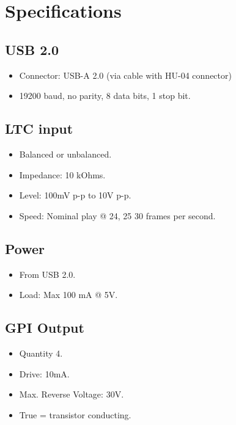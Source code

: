\documentclass{article}
\begin{document}
	\section{Specifications}\label{specifications}
		
		\subsection{USB 2.0}\label{usb-2.0}
			\begin{itemize}
				\item
				Connector: USB-A 2.0 (via cable with HU-04 connector)
				\item
				19200 baud, no parity, 8 data bits, 1 stop bit.
			\end{itemize}
		
		\subsection{LTC input}\label{ltc-input-1}
			\begin{itemize}
				\item
				Balanced or unbalanced.
				\item
				Impedance: 10 kOhms.
				\item
				Level: 100mV p-p to 10V p-p.
				\item
				Speed: Nominal play @ 24, 25 30 frames per second.
			\end{itemize}
	
	\subsection{Power}\label{power}
		\begin{itemize}
			\item
			From USB 2.0.
			\item
			Load: Max 100 mA @ 5V.
		\end{itemize}
	
	\subsection{GPI Output}\label{gpi-output}
		\begin{itemize}
			\item
			Quantity 4.
			\item
			Drive: 10mA.
			\item
			Max. Reverse Voltage: 30V.
			\item
			True = transistor conducting.
		\end{itemize}
	
\end{document}
